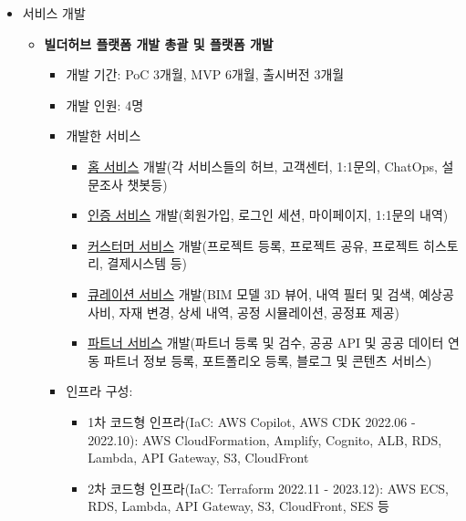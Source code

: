 
\begin{itemize}[label=]
	\item 서비스 개발
	      \begin{itemize}[label=]
		      \item \textbf{빌더허브 플랫폼 개발 총괄 및 플랫폼 개발} \hyperref[bhplf]{\space {}}
		            \begin{itemize}[label=]
			            \item 개발 기간: PoC 3개월, MVP 6개월, 출시버전 3개월
			            \item 개발 인원: 4명
			            \item 개발한 서비스
			                  \begin{itemize}
				                  \item \href{https://builderhub.io}{홈 서비스} 개발(각 서비스들의 허브, 고객센터, 1:1문의, ChatOps, 설문조사 챗봇등)
				                  \item \href{https://auth.builderhub.io}{인증 서비스} 개발(회원가입, 로그인 세션, 마이페이지, 1:1문의 내역)
				                  \item \href{https://app.builderhub.io}{커스터머 서비스} 개발(프로젝트 등록, 프로젝트 공유, 프로젝트 히스토리, 결제시스템 등)
				                  \item \href{https://curation.builderhub.io/project/tester}{큐레이션 서비스} 개발(BIM 모델 3D 뷰어, 내역 필터 및 검색, 예상공사비, 자재 변경, 상세 내역, 공정 시뮬레이션, 공정표 제공)
				                  \item \href{https://partners.builderhub.io/}{파트너 서비스} 개발(파트너 등록 및 검수, 공공 API 및 공공 데이터 연동 파트너 정보 등록, 포트폴리오 등록, 블로그 및 콘텐츠 서비스)
			                  \end{itemize}
			            \item 인프라 구성:
			                  \begin{itemize}
				                  \item 1차 코드형 인프라(IaC: AWS Copilot, AWS CDK 2022.06 - 2022.10): AWS CloudFormation, Amplify, Cognito, ALB, RDS, Lambda, API Gateway, S3, CloudFront
				                  \item 2차 코드형 인프라(IaC: Terraform 2022.11 - 2023.12): AWS ECS, RDS, Lambda, API Gateway, S3, CloudFront, SES 등

\end{itemize}
\end{itemize}
\end{itemize}
\end{itemize}
